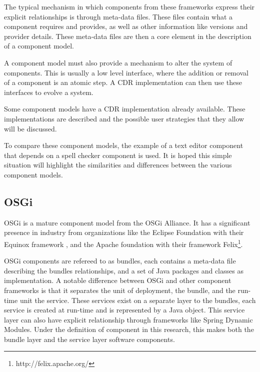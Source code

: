 The typical mechanism in which components from these frameworks express their explicit relationships is through meta-data files.
These files contain what a component requires and provides, as well as other information like versions and provider details.
These meta-data files are then a core element in the description of a component model.

A component model must also provide a mechanism to alter the system of components.
This is usually a low level interface, where the addition or removal of a component is an atomic step.
A CDR implementation can then use these interfaces to evolve a system.

Some component models have a CDR implementation already available.
These implementations are described and the possible user strategies that they allow will be discussed. 

To compare these component models, the example of a text editor component that depends on a spell checker component is used.
It is hoped this simple situation will highlight the similarities and differences between the various component models.

\subsection{OSGi}
OSGi is a mature component model from the OSGi Alliance.
It has a significant presence in industry \citep{Kriens2008} from organizations like the Eclipse Foundation with their Equinox framework \citep{mcaffer2010osgi}, 
and the Apache foundation with their framework Felix\footnote{http://felix.apache.org/}.

OSGi components are refereed to as bundles, each contains a meta-data file describing the bundles relationships, and a set of Java packages and classes as implementation.
A notable difference between OSGi and other component frameworks is that it separates the unit of deployment, the bundle, and the run-time unit the service.
These services exist on a separate layer to the bundles, each service is created at run-time and is represented by a Java object.
This service layer can also have explicit relationship through frameworks like Spring Dynamic Modules.
Under the definition of component in this research, this makes both the bundle layer and the service layer software components.


